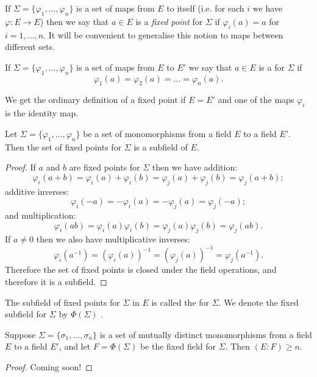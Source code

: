 If $\Sigma = \{\varphi_1, \dots, \varphi_n\}$ is a set of maps from $E$ to itself (i.e. for each $i$ we have $\varphi : E \to E$) then we say that $a \in E$ is a \emph{fixed point} for $\Sigma$ if $\varphi_i(a) = a$ for $i = 1, \dots, n$. It will be convenient to generalise this notion to maps between different sets.

\begin{definition}
	If $\Sigma = \{\varphi_1, \dots, \varphi_n\}$ is a set of maps from $E$ to $E'$ we say that $a \in E$ is a  for $\Sigma$ if
	\[
		\varphi_1(a) = \varphi_2(a) = \dots = \varphi_n(a).
	\]
\end{definition}

\begin{note}
	We get the ordinary definition of a fixed point if $E = E'$ and one of the maps $\varphi_i$ is the identity map.
\end{note}

\begin{lemma}
	Let $\Sigma = \{\varphi_1, \dots, \varphi_n\}$ be a set of monomorphisms from a field $E$ to a field $E'$. Then the set of fixed points for $\Sigma$ is a subfield of $E$.
	\begin{proof}
		If $a$ and $b$ are fixed points for $\Sigma$ then we have addition:
		\[
			\varphi_i(a + b) = \varphi_i(a) + \varphi_i(b) = \varphi_j(a) + \varphi_j(b) = \varphi_j(a + b);
		\]
		additive inverses:
		\[
			\varphi_i(-a) = -\varphi_i(a) = -\varphi_j(a) = \varphi_j(-a);
		\]
		and multiplication:
		\[
			\varphi_i(ab) = \varphi_i(a) \varphi_i(b) = \varphi_j(a) \varphi_j(b) = \varphi_j(ab).
		\]
		If $a \neq 0$ then we also have multiplicative inverses:
		\[
			\varphi_i(a^{-1}) = (\varphi_i(a))^{-1} = (\varphi_j(a))^{-1} = \varphi_j(a^{-1}).
		\]
		Therefore the set of fixed points is closed under the field operations, and therefore it is a subfield.
	\end{proof}
\end{lemma}

The subfield of fixed points for $\Sigma$ in $E$ is called the  for $\Sigma$. We denote the fixed subfield for $\Sigma$ by $\varPhi(\Sigma)$ \index{$\varPhi(\Sigma)$}.

\begin{theorem}
	Suppose $\Sigma = \{\sigma_1, \dots, \sigma_n\}$ is a set of mutually distinct monomorphisms from a field $E$ to a field $E'$, and let $F = \varPhi(\Sigma)$ be the fixed field for $\Sigma$. Then $(E : F) \geq n$.
	\begin{proof}
		Coming soon!
	\end{proof}
\end{theorem}
